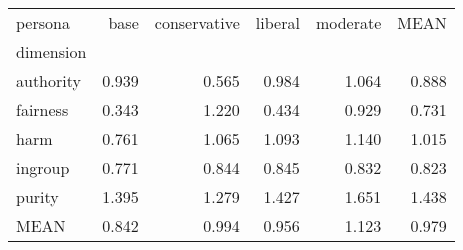 \begin{table}
\label{tab:questionnaire:moral-foundations.var.persona.dimension}
\begin{tabular}{lrrrrr}
\toprule
persona & base & conservative & liberal & moderate & MEAN \\
dimension &  &  &  &  &  \\
\midrule
authority & 0.939 & 0.565 & 0.984 & 1.064 & 0.888 \\
fairness & 0.343 & 1.220 & 0.434 & 0.929 & 0.731 \\
harm & 0.761 & 1.065 & 1.093 & 1.140 & 1.015 \\
ingroup & 0.771 & 0.844 & 0.845 & 0.832 & 0.823 \\
purity & 1.395 & 1.279 & 1.427 & 1.651 & 1.438 \\
MEAN & 0.842 & 0.994 & 0.956 & 1.123 & 0.979 \\
\bottomrule
\end{tabular}
\end{table}
